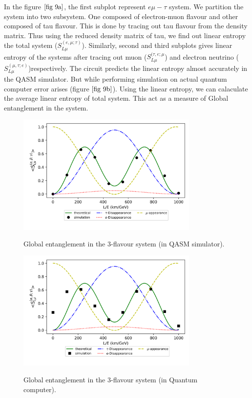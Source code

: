 \documentclass[12pt,a4paper]{report}
\begin{document}
In the figure $\ref{fig 9a}$, the first subplot represent $e\mu-\tau$ system. We partition the system into two subsystem. One composed of electron-muon flavour and other composed of tau flavour. This is done by tracing out tau flavour from the density matrix. Thus using the reduced density matrix of tau, we find out linear entropy the total system ($S^{(e,\mu;\tau)}_{L\mu}$). Similarly, second and third subplots gives linear entropy of the systems after tracing out muon ($S^{(\tau,e;\mu}_{L\mu}$) and electron neutrino ($S^{(\mu,\tau;e)}_{L\mu}$)respectively.
The circuit predicts the linear entropy almost accurately in the QASM simulator. But while performing simulation on actual quantum computer error arises (figure $\ref{fig 9b}$). Using the linear entropy, we can calaculate the average linear entropy of total system. This act as a measure of Global entanglement in the system. 
\begin{figure}[H]
	\graphicspath{ {./Images/} }
	\centering	
	{\includegraphics[width=0.8\textwidth]{fig_9a_1.png}}
	\caption{Global entanglement in the 3-flavour system (in QASM simulator).}
	\label{fig 9a_1}
\end{figure}
\begin{figure}[h]
	\graphicspath{ {./Images/} }
	\centering	
	{\includegraphics[width=0.8\textwidth]{fig_9a_2.png}}
	\caption{Global entanglement in the 3-flavour system (in Quantum computer).}
	\label{fig 9a_2}
\end{figure}
\end{document}
